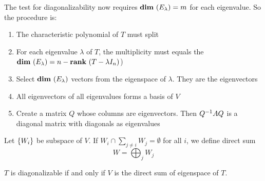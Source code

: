 The test for diagonalizability now requires $\dimension{E_\lambda} = m$ for each eigenvalue. So the procedure is:
\begin{enumerate}
    \item The characteristic polynomial of $T$ must split
    \item For each eigenvalue $\lambda$ of $T$, the multiplicity must equals the $\dimension{E_\lambda} = n - \rank{T - \lambda I_n}$)
    \item Select $\dimension{E_\lambda}$ vectors from the eigenspace of $\lambda$. They are the eigenvectors
    \item All eigenvectors of all eigenvalues forms a basis of $V$
    \item Create a matrix $Q$ whose columns are eigenvectors. Then ${Q}^{-1} A Q$ is a diagonal matrix with diagonals as eigenvalues
\end{enumerate}

\begin{definition}
    Let $\set{W_i}$ be subspace of $V$. If $W_i \cap \sum_{j \neq i} W_j = \emptyset$ for all $i$, we define direct sum
    \begin{equation}
        W = \bigoplus_{j} W_j
    \end{equation}
\end{definition}

\begin{theorem}
    $T$ is diagonalizable if and only if $V$ is the direct sum of eigenspace of $T$.    
\end{theorem}



